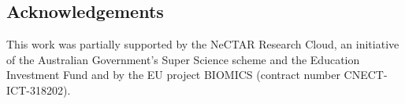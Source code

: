 \documentclass{amsart}
\theoremstyle{plain}
\theoremstyle{definition}
\begin{document}
\subsection*{Acknowledgements}
This work was partially supported by the NeCTAR Research Cloud, an
initiative of the Australian Government's Super Science scheme and the
Education Investment Fund and by the EU project BIOMICS (contract number CNECT-ICT-318202).



\end{document}
